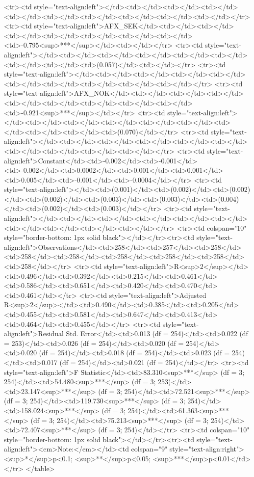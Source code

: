 <tr><td style="text-align:left"></td><td></td><td></td><td></td><td></td><td></td><td></td><td></td><td></td><td></td></tr>
<tr><td style="text-align:left">AFX_SEK</td><td></td><td></td><td></td><td></td><td></td><td></td><td></td><td>-0.795<sup>***</sup></td><td></td></tr>
<tr><td style="text-align:left"></td><td></td><td></td><td></td><td></td><td></td><td></td><td></td><td>(0.057)</td><td></td></tr>
<tr><td style="text-align:left"></td><td></td><td></td><td></td><td></td><td></td><td></td><td></td><td></td><td></td></tr>
<tr><td style="text-align:left">AFX_NOK</td><td></td><td></td><td></td><td></td><td></td><td></td><td></td><td></td><td>-0.921<sup>***</sup></td></tr>
<tr><td style="text-align:left"></td><td></td><td></td><td></td><td></td><td></td><td></td><td></td><td></td><td>(0.070)</td></tr>
<tr><td style="text-align:left"></td><td></td><td></td><td></td><td></td><td></td><td></td><td></td><td></td><td></td></tr>
<tr><td style="text-align:left">Constant</td><td>-0.002</td><td>-0.001</td><td>-0.002</td><td>0.0002</td><td>0.001</td><td>0.001</td><td>0.005</td><td>-0.001</td><td>-0.0004</td></tr>
<tr><td style="text-align:left"></td><td>(0.001)</td><td>(0.002)</td><td>(0.002)</td><td>(0.002)</td><td>(0.003)</td><td>(0.003)</td><td>(0.004)</td><td>(0.002)</td><td>(0.003)</td></tr>
<tr><td style="text-align:left"></td><td></td><td></td><td></td><td></td><td></td><td></td><td></td><td></td><td></td></tr>
<tr><td colspan="10" style="border-bottom: 1px solid black"></td></tr><tr><td style="text-align:left">Observations</td><td>258</td><td>257</td><td>258</td><td>258</td><td>258</td><td>258</td><td>258</td><td>258</td><td>258</td></tr>
<tr><td style="text-align:left">R<sup>2</sup></td><td>0.496</td><td>0.392</td><td>0.215</td><td>0.461</td><td>0.586</td><td>0.651</td><td>0.420</td><td>0.470</td><td>0.461</td></tr>
<tr><td style="text-align:left">Adjusted R<sup>2</sup></td><td>0.490</td><td>0.385</td><td>0.205</td><td>0.455</td><td>0.581</td><td>0.647</td><td>0.413</td><td>0.464</td><td>0.455</td></tr>
<tr><td style="text-align:left">Residual Std. Error</td><td>0.013 (df = 254)</td><td>0.022 (df = 253)</td><td>0.026 (df = 254)</td><td>0.020 (df = 254)</td><td>0.020 (df = 254)</td><td>0.018 (df = 254)</td><td>0.023 (df = 254)</td><td>0.017 (df = 254)</td><td>0.021 (df = 254)</td></tr>
<tr><td style="text-align:left">F Statistic</td><td>83.310<sup>***</sup> (df = 3; 254)</td><td>54.480<sup>***</sup> (df = 3; 253)</td><td>23.147<sup>***</sup> (df = 3; 254)</td><td>72.521<sup>***</sup> (df = 3; 254)</td><td>119.730<sup>***</sup> (df = 3; 254)</td><td>158.024<sup>***</sup> (df = 3; 254)</td><td>61.363<sup>***</sup> (df = 3; 254)</td><td>75.213<sup>***</sup> (df = 3; 254)</td><td>72.407<sup>***</sup> (df = 3; 254)</td></tr>
<tr><td colspan="10" style="border-bottom: 1px solid black"></td></tr><tr><td style="text-align:left"><em>Note:</em></td><td colspan="9" style="text-align:right"><sup>*</sup>p<0.1; <sup>**</sup>p<0.05; <sup>***</sup>p<0.01</td></tr>
</table>

